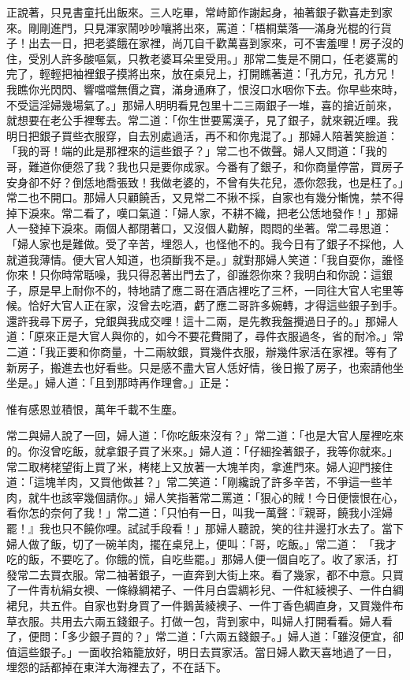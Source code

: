 正說著，只見書童托出飯來。三人吃畢，常峙節作謝起身，袖著銀子歡喜走到家來。剛剛進門，只見渾家鬧吵吵嚷將出來，罵道：「梧桐葉落──滿身光棍的行貨子！出去一日，把老婆餓在家裡，尚兀自千歡萬喜到家來，可不害羞哩！房子沒的住，受別人許多酸嘔氣，只教老婆耳朵里受用。」那常二隻是不開口，任老婆罵的完了，輕輕把袖裡銀子摸將出來，放在桌兒上，打開瞧著道：「孔方兄，孔方兄！我瞧你光閃閃、響噹噹無價之寶，滿身通麻了，恨沒口水咽你下去。你早些來時，不受這淫婦幾場氣了。」那婦人明明看見包里十二三兩銀子一堆，喜的搶近前來，就想要在老公手裡奪去。常二道：「你生世要罵漢子，見了銀子，就來親近哩。我明日把銀子買些衣服穿，自去別處過活，再不和你鬼混了。」那婦人陪著笑臉道：「我的哥！端的此是那裡來的這些銀子？」常二也不做聲。婦人又問道：「我的哥，難道你便怨了我？我也只是要你成家。今番有了銀子，和你商量停當，買房子安身卻不好？倒恁地喬張致！我做老婆的，不曾有失花兒，憑你怨我，也是枉了。」常二也不開口。那婦人只顧饒舌，又見常二不揪不採，自家也有幾分慚愧，禁不得掉下淚來。常二看了，嘆口氣道：「婦人家，不耕不織，把老公恁地發作！」那婦人一發掉下淚來。兩個人都閉著口，又沒個人勸解，悶悶的坐著。常二尋思道：「婦人家也是難做。受了辛苦，埋怨人，也怪他不的。我今日有了銀子不採他，人就道我薄情。便大官人知道，也須斷我不是。」就對那婦人笑道：「我自耍你，誰怪你來！只你時常聒噪，我只得忍著出門去了，卻誰怨你來？我明白和你說：這銀子，原是早上耐你不的，特地請了應二哥在酒店裡吃了三杯，一同往大官人宅里等候。恰好大官人正在家，沒曾去吃酒，虧了應二哥許多婉轉，才得這些銀子到手。還許我尋下房子，兌銀與我成交哩！這十二兩，是先教我盤攪過日子的。」那婦人道：「原來正是大官人與你的，如今不要花費開了，尋件衣服過冬，省的耐冷。」常二道：「我正要和你商量，十二兩紋銀，買幾件衣服，辦幾件家活在家裡。等有了新房子，搬進去也好看些。只是感不盡大官人恁好情，後日搬了房子，也索請他坐坐是。」婦人道：「且到那時再作理會。」正是：

惟有感恩並積恨，萬年千載不生塵。

常二與婦人說了一回，婦人道：「你吃飯來沒有？」常二道：「也是大官人屋裡吃來的。你沒曾吃飯，就拿銀子買了米來。」婦人道：「仔細拴著銀子，我等你就來。」常二取栲栳望街上買了米，栲栳上又放著一大塊羊肉，拿進門來。婦人迎門接住道：「這塊羊肉，又買他做甚？」常二笑道：「剛纔說了許多辛苦，不爭這一些羊肉，就牛也該宰幾個請你。」婦人笑指著常二罵道：「狠心的賊！今日便懷恨在心，看你怎的奈何了我！」常二道：「只怕有一日，叫我一萬聲：『親哥，饒我小淫婦罷！』我也只不饒你哩。試試手段看！」那婦人聽說，笑的往井邊打水去了。當下婦人做了飯，切了一碗羊肉，擺在桌兒上，便叫：「哥，吃飯。」常二道： 「我才吃的飯，不要吃了。你餓的慌，自吃些罷。」那婦人便一個自吃了。收了家活，打發常二去買衣服。常二袖著銀子，一直奔到大街上來。看了幾家，都不中意。只買了一件青杭絹女襖、一條綠綢裙子、一件月白雲綢衫兒、一件紅綾襖子、一件白綢裙兒，共五件。自家也對身買了一件鵝黃綾襖子、一件丁香色綢直身，又買幾件布草衣服。共用去六兩五錢銀子。打做一包，背到家中，叫婦人打開看看。婦人看了，便問：「多少銀子買的？」常二道：「六兩五錢銀子。」婦人道：「雖沒便宜，卻值這些銀子。」一面收拾箱籠放好，明日去買家活。當日婦人歡天喜地過了一日，埋怨的話都掉在東洋大海裡去了，不在話下。

